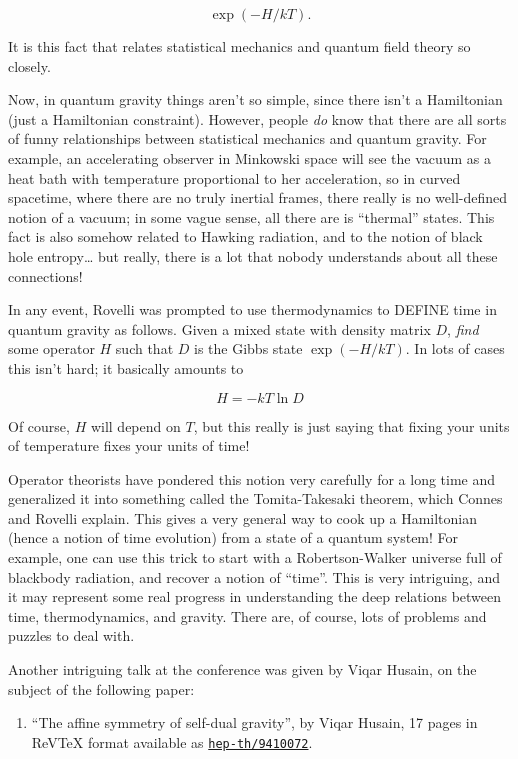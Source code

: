 \documentclass{article}
\def\tightlist{}
\begin{document}
\[\exp(-H/kT).\]

It is this fact that relates statistical mechanics and quantum field
theory so closely.

Now, in quantum gravity things aren't so simple, since there isn't a
Hamiltonian (just a Hamiltonian constraint). However, people \emph{do}
know that there are all sorts of funny relationships between statistical
mechanics and quantum gravity. For example, an accelerating observer in
Minkowski space will see the vacuum as a heat bath with temperature
proportional to her acceleration, so in curved spacetime, where there
are no truly inertial frames, there really is no well-defined notion of
a vacuum; in some vague sense, all there are is ``thermal'' states. This
fact is also somehow related to Hawking radiation, and to the notion of
black hole entropy\ldots{} but really, there is a lot that nobody
understands about all these connections!

In any event, Rovelli was prompted to use thermodynamics to DEFINE time
in quantum gravity as follows. Given a mixed state with density matrix
\(D\), \emph{find} some operator \(H\) such that \(D\) is the Gibbs
state \(\exp(-H/kT)\). In lots of cases this isn't hard; it basically
amounts to

\[H = -kT \ln D\]

Of course, \(H\) will depend on \(T\), but this really is just saying
that fixing your units of temperature fixes your units of time!

Operator theorists have pondered this notion very carefully for a long
time and generalized it into something called the Tomita-Takesaki
theorem, which Connes and Rovelli explain. This gives a very general way
to cook up a Hamiltonian (hence a notion of time evolution) from a state
of a quantum system! For example, one can use this trick to start with a
Robertson-Walker universe full of blackbody radiation, and recover a
notion of ``time''. This is very intriguing, and it may represent some
real progress in understanding the deep relations between time,
thermodynamics, and gravity. There are, of course, lots of problems and
puzzles to deal with.

Another intriguing talk at the conference was given by Viqar Husain, on
the subject of the following paper:

\begin{enumerate}
\def\labelenumi{\arabic{enumi})}
\setcounter{enumi}{4}
\tightlist
\item
  ``The affine symmetry of self-dual gravity'', by Viqar Husain, 17
  pages in ReVTeX format available as
  \href{http://xxx.lanl.gov/abs/hep-th/9410072}{\texttt{hep-th/9410072}}.
\end{enumerate}
\end{document}
